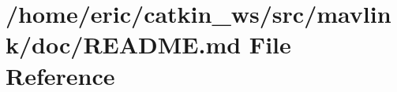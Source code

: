 \hypertarget{mavlink_2doc_2README_8md}{}\section{/home/eric/catkin\+\_\+ws/src/mavlink/doc/\+R\+E\+A\+D\+ME.md File Reference}
\label{mavlink_2doc_2README_8md}
